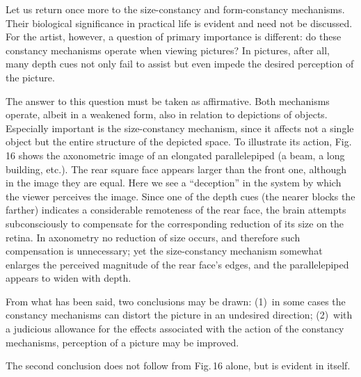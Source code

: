 

Let us return once more to the size-constancy and form-constancy mechanisms.  Their
biological significance in practical life is evident and need not be discussed.  For the
artist, however, a question of primary importance is different: do these constancy
mechanisms operate when viewing pictures?  In pictures, after all, many depth cues not
only fail to assist but even impede the desired perception of the picture.

The answer to this question must be taken as affirmative.  Both mechanisms operate,
albeit in a weakened form, also in relation to depictions of objects.  Especially important
is the size-constancy mechanism, since it affects not a single object but the entire
structure of the depicted space.  To illustrate its action, Fig.\,16 shows the axonometric
image of an elongated parallelepiped (a beam, a long building, etc.).  The rear square
face appears larger than the front one, although in the image they are equal.  Here we
see a ``deception'' in the system by which the viewer perceives the image.  Since one of
the depth cues (the nearer blocks the farther) indicates a considerable remoteness of the
rear face, the brain attempts subconsciously to compensate for the corresponding
reduction of its size on the retina.  In axonometry no reduction of size occurs, and
therefore such compensation is unnecessary; yet the size-constancy mechanism
somewhat enlarges the perceived magnitude of the rear face's edges, and the
parallelepiped appears to widen with depth.

From what has been said, two conclusions may be drawn:
(1)~in some cases the constancy mechanisms can distort the picture in an undesired
direction;
(2)~with a judicious allowance for the effects associated with the action of the
constancy mechanisms, perception of a picture may be improved.

The second conclusion does not follow from Fig.\,16 alone, but is evident in itself.
